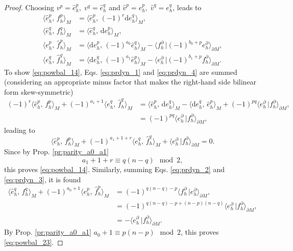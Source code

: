 \documentclass{elsarticle}
\renewcommand\d{\ensuremath{\mathrm{d}}}
\newcommand*{\dual}[1]{\ensuremath{\widehat{#1}}}
\newcommand{\inpr}[3][]{\ensuremath{\langle #2, \, #3 \rangle_{#1}}}
\newcommand{\dualpr}[3][]{\ensuremath{\langle #2 \, \vert #3 \rangle_{#1}}}
\begin{document}
\begin{proof}
Choosing $v^p = \dual{e}^p_h, \; v^q = \dual{e}^q_h$ and $\dual{v}^p = e^p_h, \; \dual{v}^q = {e}^q_h$, leads to 
\begin{align}
      \inpr[M]{\dual{e}^p_h}{f^p_h} &= \inpr[M]{\dual{e}^p_h}{(-1)^r\d e^q_h}, \label{eq:prdyn_1}\\
      \inpr[M]{\dual{e}^q_h}{f^q_h} &= \inpr[M]{\dual{e}^q_h}{\d e^p_h}, \label{eq:prdyn_2}\\
      \inpr[M]{e^p_h}{\dual{f}^p_h} &= \inpr[M]{\d e^p_h}{(-1)^{a_0} \dual{e}^q_h} - \dualpr[\partial M]{f^\partial_h}{(-1)^{b_0+p}{e}^\partial_h}, \label{eq:prdyn_3}\\
      \inpr[M]{e^q_h}{\dual{f}^q_h} &= \inpr[M]{\d e^q_h}{(-1)^{a_1} \dual{e}^p_h} - \dualpr[\partial M]{e^\partial_h}{(-1)^{b_1+p}{f^\partial_h}}. \label{eq:prdyn_4}
\end{align}
To show \eqref{eq:powbal_14}, Eqs. \eqref{eq:prdyn_1} and \eqref{eq:prdyn_4} are summed (considering an appropriate minus factor that makes the right-hand side bilinear form skew-symmetric)
\begin{equation}
\begin{aligned}
    (-1)^r \inpr[M]{\dual{e}^p_h}{f^p_h} + (-1)^{a_1+1} \inpr[M]{e^q_h}{\dual{f}^q_h} &= \inpr[M]{\dual{e}^p_h}{\d e^q_h} - \inpr[M]{\d e^q_h}{\dual{e}^p_h} + (-1)^{pq}\dualpr[\partial M]{e^\partial_h}{{f}^\partial_h}, \\
    &= (-1)^{pq}\dualpr[\partial M]{e^\partial_h}{f^\partial_h},
\end{aligned}
\end{equation}
leading to
\begin{equation}
    \inpr[M]{\dual{e}^p_h}{f^p_h} + (-1)^{a_1+1+r} \inpr[M]{e^q_h}{\dual{f}^q_h} + \dualpr[\partial M]{e^\partial_h}{f^\partial_h} = 0.
\end{equation}
Since by Prop. \ref{pr:parity_a0_a1} 
$$a_1+1+r \equiv q(n-q) \mod{2},$$ 
this proves \eqref{eq:powbal_14}. Similarly, summing Eqs. \eqref{eq:prdyn_2} and \eqref{eq:prdyn_3}, it is found 
\begin{equation}
\begin{aligned}
    \inpr[M]{\dual{e}^q_h}{f^q_h} + (-1)^{a_0+1} \inpr[M]{e^p_h}{\dual{f}^p_h} &= (-1)^{q(n-q)-p}\dualpr[\partial M]{f^\partial_h}{e^\partial_h}, \\
    &= (-1)^{q(n-q)-p+(n-p)(n-q)}\dualpr[\partial M]{e^\partial_h}{f^\partial_h}, \\
    &= -\dualpr[\partial M]{e^\partial_h}{f^\partial_h}.
\end{aligned}
\end{equation}
By Prop. \eqref{pr:parity_a0_a1} $a_0 + 1 \equiv p(n-p) \mod 2$, this proves \eqref{eq:powbal_23}.
\end{proof}
 
\end{document}
